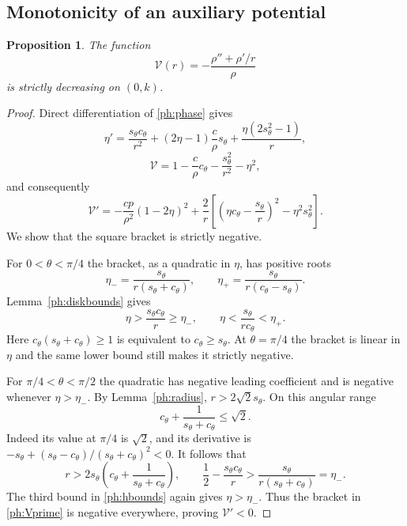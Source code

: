 \documentclass[11pt]{article}
\newtheorem{proposition}[theorem]{Proposition}
\theoremstyle{remark}
\begin{document}
\subsection{Monotonicity of an auxiliary potential}
\begin{proposition}\label{ph:potential}
The function
\[
 \mathcal V(r)=-\frac{\rho''+\rho'/r}{\rho}
\]
is strictly decreasing on $(0,k)$.
\end{proposition}
\begin{proof}
Direct differentiation of \eqref{ph:phase} gives
\[
 \eta'=\frac{s_\theta c_\theta}{r^2}+(2\eta-1)\frac{c}{\rho} s_\theta
                     +\frac{\eta(2s_\theta^2-1)}r,
\]
\[
 \mathcal V=1-\frac{c}{\rho} c_\theta-\frac{s_\theta^2}{r^2}-\eta^2,
\]
and consequently
\begin{equation}\label{ph:Vprime}
 \mathcal V'=-\frac{cp}{\rho^2}(1-2\eta)^2
 +\frac2r\left[\left(\eta c_\theta-\frac{s_\theta}{r}\right)^2-\eta^2s_\theta^2\right].
\end{equation}
We show that the square bracket is strictly negative.

For $0<\theta<\pi/4$ the bracket, as a quadratic in $\eta$, has
positive roots
\[
 \eta_- =\frac{s_\theta}{r(s_\theta+c_\theta)},\qquad \eta_+=\frac{s_\theta}{r(c_\theta-s_\theta)}.
\]
Lemma~\ref{ph:diskbounds} gives
\[
 \eta>\frac{s_\theta c_\theta}{r}\ge \eta_-,\qquad
 \eta<\frac{s_\theta}{r c_\theta}<\eta_+.
\]
Here $c_\theta(s_\theta+c_\theta)\ge1$ is equivalent to $c_\theta\ge s_\theta$.
At $\theta=\pi/4$ the bracket is linear in $\eta$ and the same lower
bound still makes it strictly negative.

For $\pi/4<\theta<\pi/2$ the quadratic has negative leading
coefficient and is negative whenever $\eta>\eta_-$. By
Lemma~\ref{ph:radius}, $r>2\sqrt2s_\theta$. On this angular range
\[
 c_\theta+\frac1{s_\theta+c_\theta}\le\sqrt2.
\]
Indeed its value at $\pi/4$ is $\sqrt2$, and its derivative is
$-s_\theta+(s_\theta-c_\theta)/(s_\theta+c_\theta)^2<0$. It follows that
\[
 r>2s_\theta\left(c_\theta+\frac1{s_\theta+c_\theta}\right),\qquad
 \frac12-\frac{s_\theta c_\theta}{r}>\frac{s_\theta}{r(s_\theta+c_\theta)}=\eta_-.
\]
The third bound in \eqref{ph:hbounds} again gives $\eta>\eta_-$.
Thus the bracket in \eqref{ph:Vprime} is negative everywhere, proving
$\mathcal V'<0$.
\end{proof}
\end{document}
